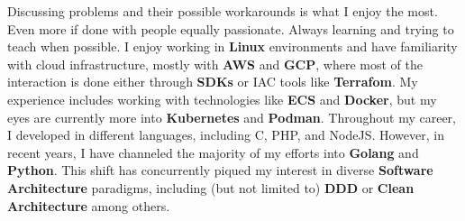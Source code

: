 

%
\begin{cventries}

\vspace{-3.5mm}  
\cventry
  {}
  {}
  {}
  {}
  {Discussing problems and their possible workarounds is what I enjoy the most. Even more if done with people equally passionate. Always learning and trying to teach when possible. I enjoy working in \textbf{Linux} environments and have familiarity with cloud infrastructure, mostly with \textbf{AWS} and \textbf{GCP}, where most of the interaction is done either through \textbf{SDKs} or IAC tools like \textbf{Terrafom}. My experience includes working with technologies like \textbf{ECS} and \textbf{Docker}, but my eyes are currently more into \textbf{Kubernetes} and \textbf{Podman}. Throughout my career, I developed in different languages, including C, PHP, and NodeJS. However, in recent years, I have channeled the majority of my efforts into \textbf{Golang} and \textbf{Python}. This shift has concurrently piqued my interest in diverse \textbf{Software Architecture} paradigms, including (but not limited to) \textbf{DDD} or \textbf{Clean Architecture} among others.}
\end{cventries}